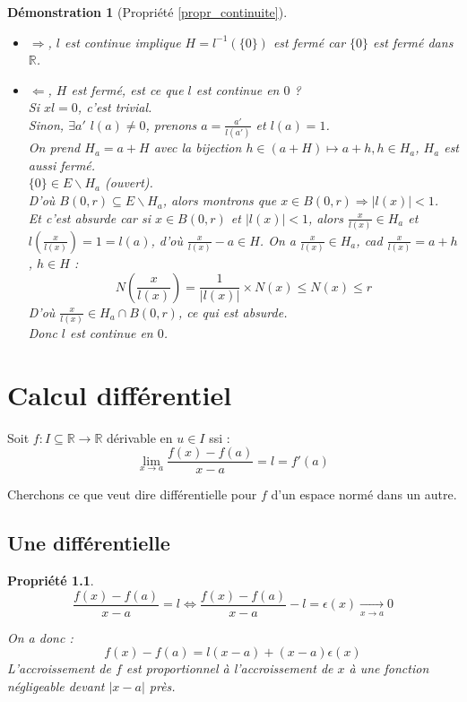 \documentclass[a4paper, oneside]{report}
\theoremstyle{break}
\newtheorem{propr}[thm]{Propriété}
\newtheorem*{demo}{Démonstration}
\newcommand{\x}{\times}
\newcommand{\R}{\mathbb{R}}
\newcommand{\fracun}[1]{\frac{1}{#1}}
\begin{document}
\begin{demo}[Propriété \ref{propr_continuite}]
\begin{itemize}
\item $\Rightarrow$, $l$ est continue implique $H=l^{-1}(\{0\})$ est fermé car $\{0\}$ est fermé dans $\R$.
\item $\Leftarrow$, $H$ est fermé, est ce que $l$ est continue en $0$ ?\\
Si $xl=0$, c'est trivial.\\
Sinon, $\exists a'$ $l(a)\neq 0$, prenons $a=\frac{a'}{l(a')}$ et $l(a)=1$.\\
On prend $H_a = a+H$ avec la bijection $h\in (a+H) \mapsto a+ h, h\in H_a$, $H_a$ est aussi fermé.\\
$\{0\}\in E\backslash H_a$ (ouvert).\\
D'où $B(0,r)\subseteq E\backslash H_a$, alors montrons que $x\in B(0,r)\Rightarrow |l(x)|<1$.\\
Et c'est absurde car si $x\in B(0,r)$ et $|l(x)|<1$, alors $\frac{x}{l(x)}\in H_a$ et $l(\frac{x}{l(x)})=1=l(a)$, d'où $\frac{x}{l(x)}-a\in H$.
On a $\frac{x}{l(x)}\in H_a$, cad $\frac{x}{l(x)}=a+h$, $h\in H$ :
$$N(\frac{x}{l(x)})=\fracun{|l(x)|}\x N(x)\leq N(x)\leq r$$
D'où $\frac{x}{l(x)}\in H_a \cap B(0,r)$, ce qui est absurde.\\
Donc $l$ est continue en $0$.
\end{itemize}
\end{demo}

\chapter{Calcul différentiel}

Soit $f:I\subseteq \R \rightarrow \R$ dérivable en $u\in I$ ssi :
$$\lim\limits_{x\rightarrow a}\frac{f(x)-f(a)}{x-a}=l=f'(a)$$

Cherchons ce que veut dire différentielle pour $f$ d'un espace normé dans un autre.

\section{Une différentielle}

\begin{propr}
$$\frac{f(x)-f(a)}{x-a}=l \Leftrightarrow \frac{f(x)-f(a)}{x-a}-l=\epsilon(x)\underset{x\rightarrow a}{\rightarrow} 0$$

On a donc :
$$f(x)-f(a)=l(x-a)+(x-a)\epsilon(x)$$
L'accroissement de $f$ est proportionnel à l'accroissement de $x$ à une fonction négligeable devant $|x-a|$ près.
\end{propr}
\end{document}
